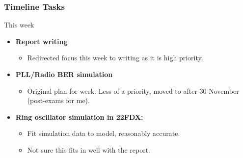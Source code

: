 \documentclass[t, screen, aspectratio=43]{beamer}
\begin{document}
\begin{frame}
	\frametitle{Timeline Tasks}
	\begin{block}{This week}
		\begin{itemize}
			\footnotesize
			\item \textbf{Report writing}
			\begin{itemize}
				\footnotesize
				\item Redirected focus this week to writing as it is high priority.
			\end{itemize} 
			\item {\color{red}\textbf{PLL/Radio BER simulation}}
			\begin{itemize}
				\footnotesize
				\item Original plan for week. Less of a priority, moved to after 30 November (post-exams for me).
			\end{itemize} 
			\item \textbf{Ring oscillator simulation in 22FDX:}
			\begin{itemize}
				\footnotesize
				\item Fit simulation data to model, reasonably accurate.
				\item Not sure this fits in well with the report.
			\end{itemize} 
		\end{itemize}    
	\end{block}
\end{frame}

\end{document}
